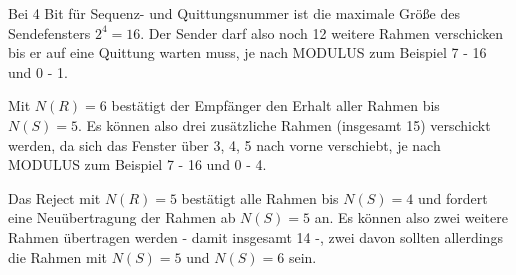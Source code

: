 \documentclass{../exercisesheet}
\begin{document}
\begin{exercise}{1.5}
\begin{subexercise}
	Bei 4 Bit für Sequenz- und Quittungsnummer ist die maximale Größe des Sendefensters $2^4 = 16$. Der Sender darf also noch 12 weitere Rahmen verschicken bis er auf eine Quittung warten muss, je nach MODULUS zum Beispiel 7 - 16 und 0 - 1.
\end{subexercise}
\begin{subexercise}
	Mit $N(R) = 6$ bestätigt der Empfänger den Erhalt aller Rahmen bis $N(S) = 5$. Es können also drei zusätzliche Rahmen (insgesamt 15) verschickt werden, da sich das Fenster über 3, 4, 5 nach vorne verschiebt, je nach MODULUS zum Beispiel 7 - 16 und 0 - 4.
\end{subexercise}
\begin{subexercise}
	Das Reject mit $N(R) = 5$ bestätigt alle Rahmen bis $N(S) = 4$ und fordert eine Neuübertragung der Rahmen ab $N(S) = 5$ an. Es können also zwei weitere Rahmen übertragen werden - damit insgesamt 14 -, zwei davon sollten allerdings die Rahmen mit $N(S) = 5$ und $N(S) = 6$ sein.
\end{subexercise}
\end{exercise}
\end{document}
